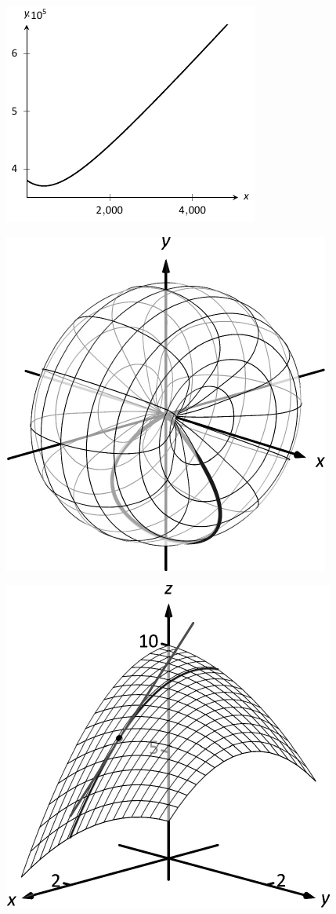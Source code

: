 \documentclass[10pt]{article}
\begin{document}
\includegraphics{figopt3dBW.pdf}
\texttt{}

\includegraphics{figparcalc8_3DBW.pdf}
\texttt{}

\includegraphics{figpartial3a_3DBW.pdf}
\texttt{}
\end{document}
